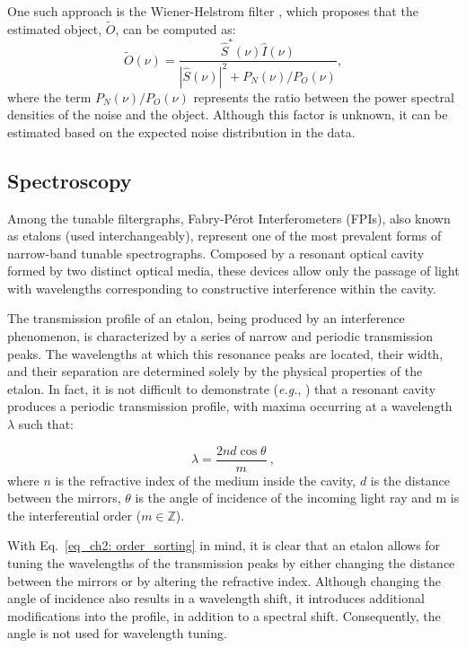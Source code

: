 One such approach is the Wiener-Helstrom filter \citep{wiener-helstorm}, which proposes that the estimated object, $\tilde{O}$, can be computed as:
\begin{equation}
  \tilde{O}(\nu) =  \frac{\hat{S}^{*}(\nu) \hat{I}(\nu)}{| \hat{S}(\nu)| ^2 + P_N (\nu) / P_O (\nu)},
  \label{eq_imaging: Wiener-Helstorm}
\end{equation} 
where the term $P_N(\nu) / P_O(\nu)$ represents the ratio between the power spectral densities of the noise and the object. Although this factor is unknown, it can be estimated based on the expected noise distribution in the data.

\subsection{Spectroscopy}

Among the tunable filtergraphs, Fabry-Pérot Interferometers (FPIs), also known as etalons (used interchangeably), represent one of the most prevalent forms of narrow-band tunable spectrographs. Composed by a resonant optical cavity formed by two distinct optical media, these devices allow only the passage of light with wavelengths corresponding to constructive interference within the cavity. 

The transmission profile of an etalon, being produced by an interference phenomenon, is characterized by a series of narrow and periodic transmission peaks. The wavelengths at which this resonance peaks are located, their width, and their separation are determined solely by the physical properties of the etalon. In fact, it is not difficult to demonstrate (\textit{e.g.}, \citealt{franI}) that a resonant cavity produces a periodic transmission profile, with maxima occurring at a wavelength $\lambda$ such that:

\begin{equation}
\lambda = \frac{2nd\cos \theta}{m}\ ,
\label{eq_ch2: order_sorting}
\end{equation}
where $n$ is the refractive index of the medium inside the cavity, $d$ is the distance between the mirrors, $\theta$ is the angle of incidence of the incoming light ray and m is the interferential order ($m \in \mathbb{Z} $). 

With Eq.~\eqref{eq_ch2: order_sorting} in mind, it is clear that an etalon allows for tuning the wavelengths of the transmission peaks by either changing the distance between the mirrors or by altering the refractive index. Although changing the angle of incidence also results in a wavelength shift, it introduces additional modifications into the profile, in addition to a spectral shift. Consequently, the angle is not used for wavelength tuning.

